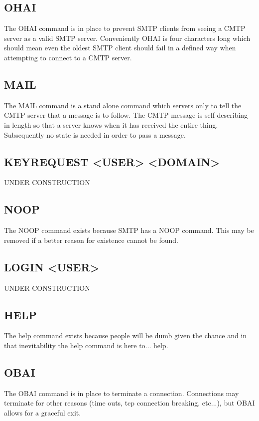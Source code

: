 \documentclass[a4paper,11pt]{article}
\begin{document}
\subsection{OHAI}
The OHAI command is in place to prevent SMTP clients from seeing a CMTP server as a valid SMTP server. Conveniently OHAI is four characters long which should mean even the oldest SMTP client should fail in a defined way when attempting to connect to a CMTP server.
\subsection{MAIL}
The MAIL command is a stand alone command which servers only to tell the CMTP server that a message is to follow. The CMTP message is self describing in length so that a server knows when it has received the entire thing. Subsequently no state is needed in order to pass a message.
\subsection{KEYREQUEST <USER> <DOMAIN>}
UNDER CONSTRUCTION
\subsection{NOOP}
The NOOP command exists because SMTP has a NOOP command. This may be removed if a better reason for existence cannot be found.
\subsection{LOGIN <USER>}
UNDER CONSTRUCTION
\subsection{HELP}
The help command exists because people will be dumb given the chance and in that inevitability the help command is here to... help.
\subsection{OBAI}
The OBAI command is in place to terminate a connection. Connections may terminate for other reasons (time outs, tcp connection breaking, etc...), but OBAI allows for a graceful exit. 
\end{document}
